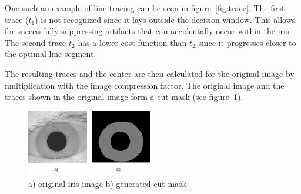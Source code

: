 \documentclass[journal]{IEEEtran}
\begin{document}
One such an example of line tracing can be seen in figure~\ref{fig:trace}. The first trace ($t_1$) is not recognized since it lays outside the decision window. This allows for successfully suppressing artifacts that can accidentally occur within the iris. The second trace $t_2$ has a lower cost function than $t_2$ since it progresses closer to the optimal line segment.
\par The resulting traces and the center are then calculated for the original image by multiplication with the image compression factor. The original image and the traces shown in the original image form a cut mask (see figure~\ref{fig:iris_cut_mask}).
\begin{figure}[h]
	\centering
  \includegraphics[width=0.49\textwidth]{iris/iris_cut_mask.png}
	\caption{a) original iris image b) generated cut mask}
	\label{fig:iris_cut_mask}
\end{figure}
\end{document}
